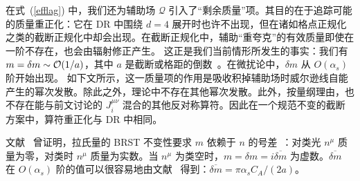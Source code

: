 在式~(\ref{efflag}) 中，我们还为辅助场 $\mathcal Q$ 引入了“剩余质量”项。其目的在于追踪可能的质量重正化：它在 DR 中围绕 $d=4$ 展开时也许不出现，但在诸如格点正规化之类的截断正规化中却会出现。在截断正规化中，辅助“重夸克”的有效质量即使在一阶不存在，也会由辐射修正产生。
这正是我们当前情形所发生的事实：我们有 $m=\delta m\sim{\cal O}(1/a)$，其中 $a$ 是截断或格距的倒数~\cite{Maiani:1991az}。在微扰论中，$\delta m$ 从 $O(\alpha_s)$ 阶开始出现。
如下文所示，这一质量项的作用是吸收积掉辅助场时威尔逊线自能产生的幂次发散。除此之外，理论中不存在其他幂次发散。此外，按量纲理由，也不存在能与前文讨论的 $J_i^{\mu\nu}$ 混合的其他反对称算符。因此在一个规范不变的截断方案中，算符重正化与 DR 中相同。

文献~\cite{Ji:2017oey} 曾证明，拉氏量的 BRST 不变性要求 $m$ 依赖于 $n$ 的号差~\cite{Dorn:1986dt}：对类光 $n^\mu$ 质量为零，对类时 $n^\mu$ 质量为实数。当 $n^\mu$ 为类空时，$m=\delta m=i\overline{\delta { m}}$ 为虚数。$\overline{\delta { m}}$ 在 $O(\alpha_s)$ 阶的值可以很容易地由文献~\cite{Ji:2017oey} 得到：$\overline{\delta { m}}={\pi\alpha_s C_A}/(2a)$。
